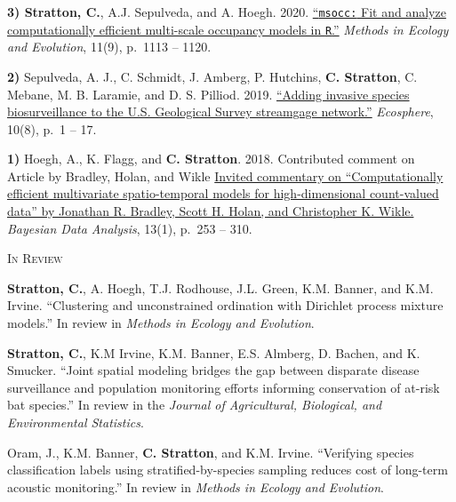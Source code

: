 \documentclass[a4paper]{article}
\newcommand{\subheader} [1] {
	{\hspace*{-9pt}\vspace*{6pt} \textcolor{Cerulean}{\textsc{#1}}}
	\vspace*{-6pt}
}
\begin{document}
\textbf{3) Stratton, C.}, A.J. Sepulveda, and A. Hoegh. 2020.
\href{https://doi.org/10.1111/2041-210X.13442}{``\texttt{msocc:} Fit and
analyze computationally efficient multi-scale occupancy models in
\texttt{R}.''} \textit{Methods in Ecology and Evolution}, 11(9), p.~1113
-- 1120. \vspace*{2mm}

\textbf{2)} Sepulveda, A. J., C. Schmidt, J. Amberg, P. Hutchins,
\textbf{C. Stratton}, C. Mebane, M. B. Laramie, and D. S. Pilliod. 2019.
\href{https://doi.org/10.1002/ecs2.2843}{``Adding invasive species
biosurveillance to the U.S. Geological Survey streamgage network.''}
\textit{Ecosphere}, 10(8), p.~1 -- 17. \vspace*{2mm}

\textbf{1)} Hoegh, A., K. Flagg, and \textbf{C. Stratton}. 2018.
Contributed comment on Article by Bradley, Holan, and Wikle
\href{https://eds.p.ebscohost.com/abstract?site=eds\&scope=site\&jrnl=19360975\&AN=138950462\&h=fupOc1pyeH8dv67mdPoRzhYvo96LS\%2bzCYNHIjAcMPojnVBydkua\%2fXFU6RanU78MDh8WNMlzPVI\%2fBxvaUiWvg\%2bw\%3d\%3d\&crl=c\&resultLocal=ErrCrlNoResults\&resultNs=Ehost\&crlhashurl=login.aspx\%3fdirect\%3dtrue\%26profile\%3dehost\%26scope\%3dsite\%26authtype\%3dcrawler\%26jrnl\%3d19360975\%26AN\%3d138950462}{Invited
commentary on ``Computationally efficient multivariate spatio-temporal
models for high-dimensional count-valued data'' by Jonathan R. Bradley,
Scott H. Holan, and Christopher K. Wikle.}
\textit{Bayesian Data Analysis}, 13(1), p.~253 -- 310. \vspace*{2mm}

\subheader{In Review}
\vspace*{2mm}

\textbf{Stratton, C.}, A. Hoegh, T.J. Rodhouse, J.L. Green, K.M. Banner,
and K.M. Irvine. ``Clustering and unconstrained ordination with
Dirichlet process mixture models.'' In review in
\textit{Methods in Ecology and Evolution}. \vspace*{2mm}

\textbf{Stratton, C.}, K.M Irvine, K.M. Banner, E.S. Almberg, D. Bachen,
and K. Smucker. ``Joint spatial modeling bridges the gap between
disparate disease surveillance and population monitoring efforts
informing conservation of at-risk bat species.'' In review in the
\textit{Journal of Agricultural, Biological, and Environmental Statistics}.
\vspace*{2mm}

Oram, J., K.M. Banner, \textbf{C. Stratton}, and K.M. Irvine.
``Verifying species classification labels using stratified-by-species
sampling reduces cost of long-term acoustic monitoring.'' In review in
\textit{Methods in Ecology and Evolution}. \vspace*{2mm}
\end{document}
